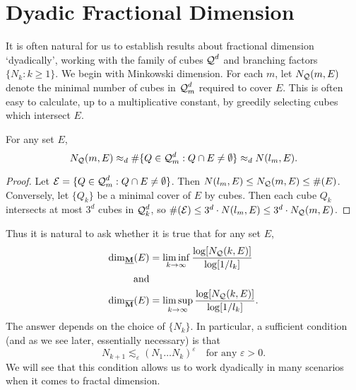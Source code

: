 \section{Dyadic Fractional Dimension}

It is often natural for us to establish results about fractional dimension `dyadically', working with the family of cubes $\operatorname{\mathcal{Q}}^d$ and branching factors $\{ N_k : k \geq 1 \}$. We begin with Minkowski dimension. For each $m$, let $N_{\operatorname{\mathcal{Q}}}(m,E)$ denote the minimal number of cubes in $\operatorname{\mathcal{Q}}_m^d$ required to cover $E$. This is often easy to calculate, up to a multiplicative constant, by greedily selecting cubes which intersect $E$.

\begin{lemma} \label{comparableCovers}
	For any set $E$,
	\[ N_{\operatorname{\mathcal{Q}}}(m,E) \approx_d \# \{ Q \in \operatorname{\mathcal{Q}}_m^d : Q \cap E \neq \emptyset \} \approx_d N(l_m,E). \]
\end{lemma}
\begin{proof}
	Let $\mathcal{E} = \{ Q \in \operatorname{\mathcal{Q}}_m^d : Q \cap E \neq \emptyset \}$. Then $N(l_m,E) \leq N_{\operatorname{\mathcal{Q}}}(m,E) \leq \#(E)$. Conversely, let $\{ Q_k \}$ be a minimal cover of $E$ by cubes. Then each cube $Q_k$ intersects at most $3^d$ cubes in $\operatorname{\mathcal{Q}}_k^d$, so $\#(\mathcal{E}) \leq 3^d \cdot N(l_m,E) \leq 3^d \cdot N_{\operatorname{\mathcal{Q}}}(m,E)$.
\end{proof}

Thus it is natural to ask whether it is true that for any set $E$,
%
\begin{equation} \label{definingSequence}
	\begin{aligned}
		\operatorname{\dim_{\underline{\mathbf{M}}}}(E) &= \liminf_{k \to \infty} \frac{\log[N_{\operatorname{\mathcal{Q}}}(k,E)]}{\log[1/l_k]}\\
		\text{and}\\
		\operatorname{\dim_{\overline{\mathbf{M}}}}(E) &= \limsup_{k \to \infty} \frac{\log[N_{\operatorname{\mathcal{Q}}}(k,E)]}{\log[1/l_k]}.
	\end{aligned}
\end{equation}
%
The answer depends on the choice of $\{ N_k \}$. In particular, a sufficient condition (and as we see later, essentially necessary) is that
%
\begin{equation} \label{definingsequencegrowthrate}
	N_{k+1} \lesssim_\varepsilon (N_1 \dots N_k)^\varepsilon \quad \text{for any $\varepsilon > 0$}.
\end{equation}
%
We will see that this condition allows us to work dyadically in many scenarios when it comes to fractal dimension.

%
%

